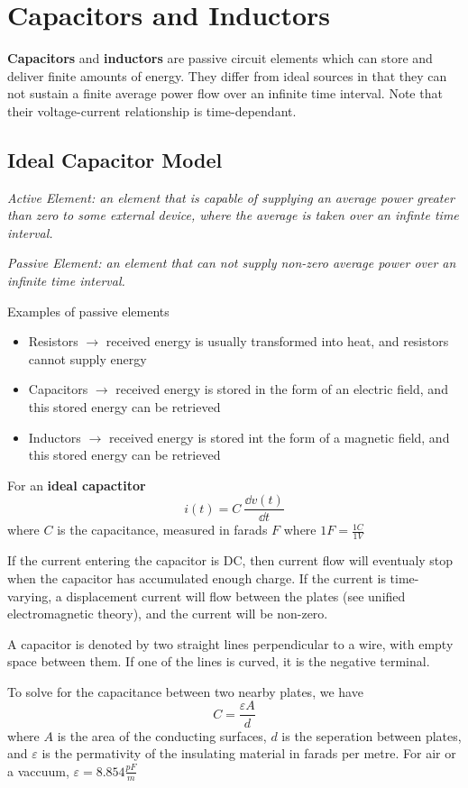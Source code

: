 \documentclass[12pt]{article}
\begin{document}
\section*{Capacitors and Inductors}
{\bf Capacitors} and {\bf inductors} are passive circuit elements which can store and deliver finite amounts of energy. They differ from ideal sources in that they can not sustain a finite average power flow over an infinite time interval. Note that their voltage-current relationship is time-dependant.

\subsection*{Ideal Capacitor Model}
\textit{Active Element: an element that is capable of supplying an average power greater than zero to some external device, where the average is taken over an infinte time interval.}

\textit{Passive Element: an element that can not supply non-zero average power over an infinite time interval.}

Examples of passive elements
\begin{itemize}
\item Resistors $\to$ received energy is usually transformed into heat, and resistors cannot supply energy
\item Capacitors $\to$ received energy is stored in the form of an electric field, and this stored energy can be retrieved
\item Inductors $\to$ received energy is stored int the form of a magnetic field, and this stored energy can be retrieved
\end{itemize}

For an {\bf ideal capactitor} \[ i(t) = C\ \frac{\dd v(t)}{\dd t} \] where $C$ is the capacitance, measured in farads $F$ where $1F = \frac{1C}{1V}$

If the current entering the capacitor is DC, then current flow will eventualy stop when the capacitor has accumulated enough charge. If the current is time-varying, a displacement current will flow between the plates (see unified electromagnetic theory), and the current will be non-zero.

A capacitor is denoted by two straight lines perpendicular to a wire, with empty space between them. If one of the lines is curved, it is the negative terminal.

To solve for the capacitance between two nearby plates, we have \[ C = \frac{\varepsilon A}{d} \] where $A$ is the area of the conducting surfaces, $d$ is the seperation between plates, and $\varepsilon$ is the permativity of the insulating material in farads per metre. For air or a vaccuum, $\varepsilon = 8.854 \frac{pF}{m}$
\end{document}
